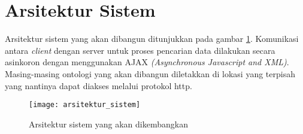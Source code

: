 \section{Arsitektur Sistem}
Arsitektur sistem yang akan dibangun ditunjukkan pada gambar \ref{fig:arsitektur_sistem}. Komunikasi antara \textit{client} dengan server untuk proses pencarian data dilakukan secara asinkoron dengan menggunakan AJAX \textit{(Asynchronous Javascript and XML)}. Masing-masing ontologi yang akan dibangun diletakkan di lokasi yang terpisah yang nantinya dapat diakses melalui protokol http.

\begin{figure}[h]
    \centering
    \texttt{[image: arsitektur\_sistem]}
    \caption{Arsitektur sistem yang akan dikembangkan}
    \label{fig:arsitektur_sistem}
\end{figure}